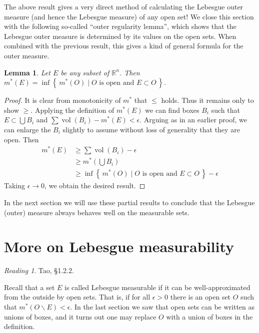 \documentclass[11pt,oneside]{amsbook}
\newcommand{\set}[1]{\left\{\,#1\,\right\}}
\renewcommand{\setminus}{\smallsetminus}
\newcommand{\RR}{\mathbb R}
\DeclareMathOperator{\vol}{vol}
\theoremstyle{definition}
\theoremstyle{plain}
\newtheorem{lem}[thm]{Lemma}
\theoremstyle{definition}
\theoremstyle{remark}
\newtheorem*{reading}{Reading}
\numberwithin{equation}{section}
\numberwithin{figure}{section}
\begin{document}
The above result gives a very direct method of calculating the Lebesgue outer measure (and hence the Lebesgue measure) of any open set! We close this section with the following so-called ``outer regularity lemma'', which shows that the Lebesgue outer measure is determined by its values on the open sets. When combined with the previous result, this gives a kind of general formula for the outer measure.

\begin{lem}
  Let $E$ be any subset of $\RR^n$. Then $m^*(E)=\inf\set{m^*(O)\mid\text{$O$ is open and }E\subset O}$.
\end{lem}

\begin{proof}
  It is clear from monotonicity of $m^*$ that $\leq$ holds. Thus it remains only to show $\geq$. Applying the definition of $m^*(E)$ we can find boxes $B_i$ such that $E\subset\bigcup B_i$ and $\sum\vol(B_i)-m^*(E)<\epsilon$. Arguing as in an earlier proof, we can enlarge the $B_i$ slightly to assume without loss of generality that they are open. Then
  \begin{align*}
    m^*(E)&\geq\sum\vol(B_i)-\epsilon\\
          &\geq m^*(\bigcup B_i)\\
          &\geq \inf\set{m^*(O)\mid\text{$O$ is open and }E\subset O}-\epsilon
  \end{align*}
  Taking $\epsilon\to0$, we obtain the desired result.
\end{proof}

In the next section we will use these partial results to conclude that the Lebesgue (outer) measure always behaves well on the measurable sets.


\section{More on Lebesgue measurability}

\begin{reading}
  Tao, \S 1.2.2.
\end{reading}

Recall that a set $E$ is called Lebesgue measurable if it can be well-approximated from the outside by open sets. That is, if for all $\epsilon>0$ there is an open set $O$ such that $m^*(O\setminus E)<\epsilon$. In the last section we saw that open sets can be written as unions of boxes, and it turns out one may replace $O$ with a union of boxes in the definition.
\end{document}
